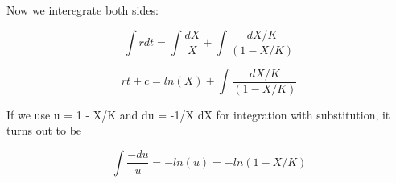 \documentclass{article}
\begin{document}
Now we interegrate both sides:

\begin{equation}
    \int r dt = \int \dfrac{dX}{X} + \int \dfrac{dX/K}{(1-X/K)}
\end{equation}

\begin{equation}
    rt + c = ln(X) + \int \dfrac{dX/K}{(1-X/K)}
\end{equation}

If we use u = 1 - X/K and du = -1/X dX for integration with substitution, it turns out to be

\begin{equation}
    \int \dfrac{-du}{u} = -ln(u) = -ln(1-X/K)    
\end{equation}
    
\end{document}

